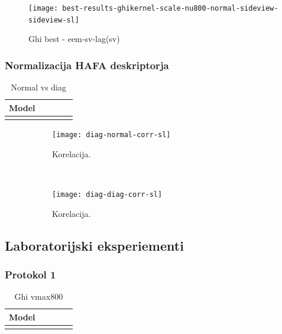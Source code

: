 \begin{figure}[!htbp]
	\centering
	\texttt{[image: best-results-ghikernel-scale-nu800-normal-sideview-sideview-sl]}
	\caption{Ghi best - eem-sv-lag(sv)}
	\label{fig:ghi}
\end{figure}



\subsubsection{Normalizacija HAFA deskriptorja}

\begin{table}[!htbp]
	\centering
	\begin{tabular}{l S[table-format=1.2, round-mode=places, round-precision=2] S[table-format=1.2, round-mode=places, round-precision=2] S[table-format=1.2, round-mode=places, round-precision=2] S[table-format=1.2, round-mode=places, round-precision=2]}
		\toprule
		\textbf{Model} &  &  &  &  \\
		\midrule
		\bottomrule
	\end{tabular}
	\caption{Normal vs diag}
	\label{tab:norm-hafa}
\end{table}

\begin{figure}[!htb]
	\centering
	\begin{subfigure}[t]{0.45\columnwidth}
		\texttt{[image: diag-normal-corr-sl]}
		\caption{Korelacija.}
		\label{fig:corr-diag-normal}
	\end{subfigure}
	~
	\begin{subfigure}[t]{0.45\columnwidth}
		\texttt{[image: diag-diag-corr-sl]}
		\caption{Korelacija.}
		\label{fig:corr-diag-diag}
	\end{subfigure}
	\caption[]{}
	\label{fig:corr-diag}
\end{figure}


\subsection{Laboratorijski eksperiementi}
\subsubsection{Protokol 1}
\begin{table}[!htbp]
	\centering
	\begin{tabular}{l S[table-format=1.2, round-mode=places, round-precision=2] S[table-format=1.2, round-mode=places, round-precision=2] S[table-format=1.2, round-mode=places, round-precision=2] S[table-format=1.2, round-mode=places, round-precision=2]}
		\toprule
		\textbf{Model} &  &  &  &  \\
		\midrule
		\bottomrule
	\end{tabular}
	\caption{Ghi vmax800}
	\label{tab:stage2-lab-1-mean}
\end{table}











